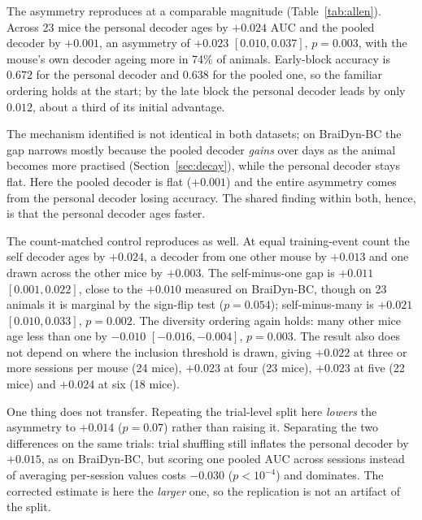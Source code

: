 \documentclass[mlabstract,onecolumn]{jmlr}
\newcommand{\auc}{\mathrm{AUC}}
\begin{document}
The asymmetry reproduces at a comparable magnitude (Table~\ref{tab:allen}). Across 23 mice the
personal decoder ages by $+0.024$ $\auc$ and the pooled decoder by $+0.001$, an asymmetry of
$+0.023$ $[0.010, 0.037]$, $p = 0.003$, with the mouse's own decoder ageing more in 74\% of animals.
Early-block accuracy is $0.672$ for the personal decoder and $0.638$ for the pooled one, so the
familiar ordering holds at the start; by the late block the personal decoder leads by only $0.012$,
about a third of its initial advantage.

The mechanism identified is not identical in both datasets; on BraiDyn-BC the gap narrows
mostly because the pooled decoder \emph{gains} over days as the animal becomes more practised
(Section~\ref{sec:decay}), while the personal decoder stays flat. Here the pooled decoder is flat
($+0.001$) and the entire asymmetry comes from the personal decoder losing accuracy. The shared
finding within both, hence, is that the personal decoder ages faster.

The count-matched control reproduces as well. At equal training-event count the self decoder ages
by $+0.024$, a decoder from one other mouse by $+0.013$ and one drawn across the other mice by
$+0.003$. The self-minus-one gap is $+0.011$ $[0.001, 0.022]$, close to the $+0.010$ measured on
BraiDyn-BC, though on 23 animals it is marginal by the sign-flip test ($p = 0.054$); self-minus-many
is $+0.021$ $[0.010, 0.033]$, $p = 0.002$. The diversity ordering again holds: many other mice age
less than one by $-0.010$ $[-0.016, -0.004]$, $p = 0.003$.
The result also does not depend on where the inclusion threshold is drawn, giving $+0.022$ at three
or more sessions per mouse (24 mice), $+0.023$ at four (23 mice), $+0.023$ at five (22 mice) and
$+0.024$ at six (18 mice).

One thing does not transfer. Repeating the trial-level split here \emph{lowers} the asymmetry to
$+0.014$ ($p = 0.07$) rather than raising it. Separating the two differences on the same trials:
trial shuffling still inflates the personal decoder by $+0.015$, as on BraiDyn-BC, but scoring one
pooled $\auc$ across sessions instead of averaging per-session values costs $-0.030$
($p < 10^{-4}$) and dominates. The corrected estimate is here the \emph{larger} one, so the
replication is not an artifact of the split.
\end{document}

